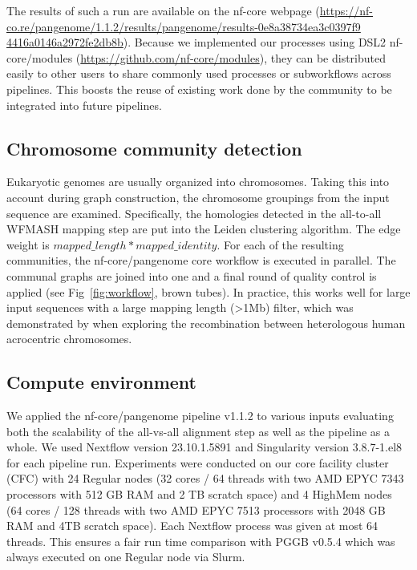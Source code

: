 \documentclass{bioinfo}
\theoremstyle{definition}
\begin{document}
	The results of such a run are available on the nf-core webpage (\href{https://nf-co.re/pangenome/1.1.2/results/pangenome/results-0e8a38734ea3c0397f94416a0146a2972fe2db8b}{https://nf-co.re/pangenome/1.1.2/results/pangenome/results-0e8a38734ea3c0397f9\\4416a0146a2972fe2db8b}). 
	Because we implemented our processes using DSL2 nf-core/modules (\href{https://github.com/nf-core/modules}{https://github.com/nf-core/modules}), they can be distributed easily to other users to share commonly used processes or subworkflows across pipelines. This boosts the reuse of existing work done by the community to be integrated into future pipelines.
	
	\subsection{Chromosome community detection}
	
	Eukaryotic genomes are usually organized into chromosomes. 
	Taking this into account during graph construction, the chromosome groupings from the input sequence are examined. 
	Specifically, the homologies detected in the all-to-all WFMASH mapping step are put into the Leiden \citep{Traag2019} clustering algorithm. 
	The edge weight is $mapped\_length * mapped\_identity$. 
	For each of the resulting communities, the nf-core/pangenome core workflow is executed in parallel. 
	The communal graphs are joined into one and a final round of quality control is applied (see Fig~\ref{fig:workflow}, brown tubes). 
	In practice, this works well for large input sequences with a large mapping length (>1Mb) filter, which was demonstrated by \cite{Guarracino2023} when exploring the recombination between heterologous human acrocentric chromosomes.
	
	\subsection{Compute environment}
	
	We applied the nf-core/pangenome pipeline v1.1.2 to various inputs evaluating both the scalability of the all-vs-all alignment step as well as the pipeline as a whole. 
	We used Nextflow version 23.10.1.5891 and Singularity version 3.8.7-1.el8 for each pipeline run. 
	Experiments were conducted on our core facility cluster (CFC) with 24 Regular nodes (32 cores / 64 threads with two AMD EPYC 7343 processors with 512 GB RAM and 2 TB scratch space) and 4 HighMem nodes (64 cores / 128 threads with two AMD EPYC 7513 processors with 2048 GB RAM and 4TB scratch space). 
	Each Nextflow process was given at most 64 threads. This ensures a fair run time comparison with PGGB v0.5.4 which was always executed on one Regular node via Slurm.
	
\end{document}
